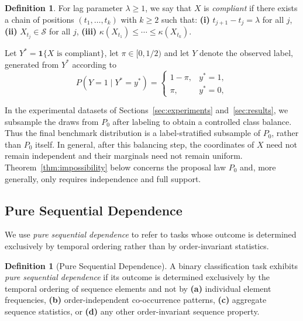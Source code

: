\documentclass{article}
\theoremstyle{plain}
\theoremstyle{definition}
\newtheorem{definition}[theorem]{Definition}
\theoremstyle{remark}
\begin{document}
\begin{definition}
\label{def:compliance}
For lag parameter $\lambda \geq 1$, we say that $X$ is \emph{compliant} if there exists a chain of positions $(t_1,\ldots,t_k)$ with $k\geq 2$ such that:
\textbf{(i)} $t_{j+1}-t_j=\lambda$ for all $j$,
\textbf{(ii)} $X_{t_j}\in\mathcal{S}$ for all $j$,
\textbf{(iii)} $\kappa(X_{t_1}) \leq \cdots \leq \kappa(X_{t_k})$.

\end{definition}

Let $Y^*=\mathbf{1}\{X \text{ is compliant}\}$, let $\pi\in[0,1/2)$ and let $Y$ denote the observed label, generated from $Y^*$ according to
\begin{equation}
\label{eq:label_noise}
P(Y=1\mid Y^*=y^*)=
\begin{cases}
1-\pi, & y^*=1,\\ \pi, & y^*=0,
\end{cases}
\end{equation}

In the experimental datasets of Sections~\ref{sec:experiments} and~\ref{sec:results}, we subsample the draws from $P_0$ after labeling to obtain a controlled class balance. Thus the final benchmark distribution is a label-stratified subsample of $P_0$, rather than $P_0$ itself. In general, after this balancing step, the coordinates of $X$ need not remain independent and their marginals need not remain uniform. Theorem~\ref{thm:impossibility} below concerns the proposal law $P_0$ and, more generally, only requires independence and full support.

\subsection{Pure Sequential Dependence}
\label{sec:pure_sequential_def}

We use \emph{pure sequential dependence} to refer to tasks whose outcome is determined exclusively by temporal ordering rather than by order-invariant statistics.

\begin{definition}[Pure Sequential Dependence]
\label{def:pure_sequential}
A binary classification task exhibits \emph{pure sequential dependence}
if its outcome is determined exclusively by the temporal ordering of
sequence elements and not by
\textbf{(a)} individual element frequencies,
\textbf{(b)} order-independent co-occurrence patterns,
\textbf{(c)} aggregate sequence statistics, or
\textbf{(d)} any other order-invariant sequence property.
\end{definition}
\end{document}
